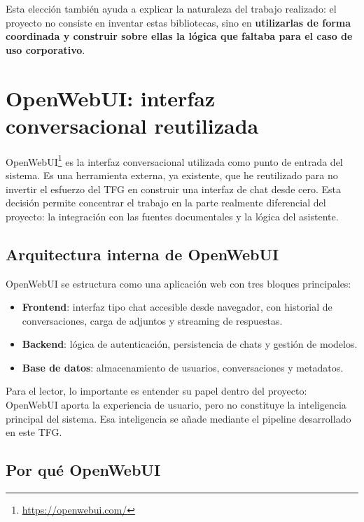Esta elección también ayuda a explicar la naturaleza del trabajo realizado: el proyecto no consiste en inventar estas bibliotecas, sino en \textbf{utilizarlas de forma coordinada y construir sobre ellas la lógica que faltaba para el caso de uso corporativo}.

\section{OpenWebUI: interfaz conversacional reutilizada}
\label{sec:openwebui}

OpenWebUI\footnote{\url{https://openwebui.com/}} es la interfaz conversacional utilizada como punto de entrada del sistema. Es una herramienta externa, ya existente, que he reutilizado para no invertir el esfuerzo del TFG en construir una interfaz de chat desde cero. Esta decisión permite concentrar el trabajo en la parte realmente diferencial del proyecto: la integración con las fuentes documentales y la lógica del asistente.

\subsection{Arquitectura interna de OpenWebUI}

OpenWebUI se estructura como una aplicación web con tres bloques principales:

\begin{itemize}
    \item \textbf{Frontend}: interfaz tipo chat accesible desde navegador, con historial de conversaciones, carga de adjuntos y streaming de respuestas.
    \item \textbf{Backend}: lógica de autenticación, persistencia de chats y gestión de modelos.
    \item \textbf{Base de datos}: almacenamiento de usuarios, conversaciones y metadatos.
\end{itemize}

Para el lector, lo importante es entender su papel dentro del proyecto: OpenWebUI aporta la experiencia de usuario, pero no constituye la inteligencia principal del sistema. Esa inteligencia se añade mediante el pipeline desarrollado en este TFG.

\subsection{Por qué OpenWebUI}

